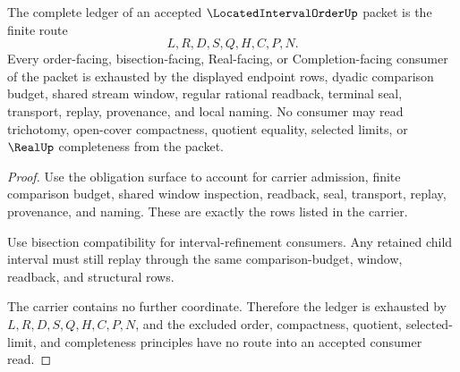\begin{theorem}
\label{thm:located-interval-order-ledger-exhaustion}
The complete ledger of an accepted $\LocatedIntervalOrderUp$ packet is the finite route
$$
L,R,D,S,Q,H,C,P,N .
$$
Every order-facing, bisection-facing, Real-facing, or Completion-facing consumer of the packet is exhausted by the displayed endpoint rows, dyadic comparison budget, shared stream window, regular rational readback, terminal seal, transport, replay, provenance, and local naming. No consumer may read trichotomy, open-cover compactness, quotient equality, selected limits, or $\RealUp$ completeness from the packet.
\end{theorem}
\begin{proof}
Use the obligation surface to account for carrier admission, finite comparison budget, shared window inspection, readback, seal, transport, replay, provenance, and naming. These are exactly the rows listed in the carrier.

Use bisection compatibility for interval-refinement consumers. Any retained child interval must still replay through the same comparison-budget, window, readback, and structural rows.

The carrier contains no further coordinate. Therefore the ledger is exhausted by $L,R,D,S,Q,H,C,P,N$, and the excluded order, compactness, quotient, selected-limit, and completeness principles have no route into an accepted consumer read.
\end{proof}


\begin{closurestatus}{\LocatedIntervalOrderUp}
  \theoryclosure{\seedClosure}
  \formalstatus{\unformalizedV}
\end{closurestatus}
